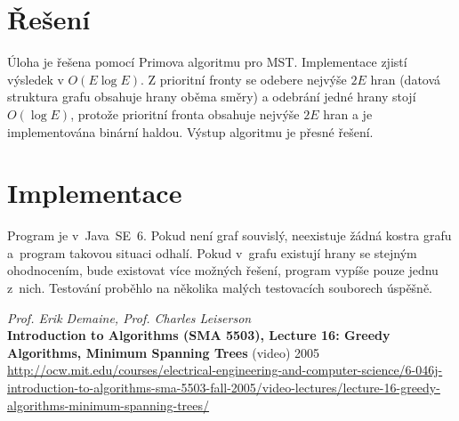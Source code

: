 \documentclass[11pt]{article}
\begin{document}
\clearpage
\section{Řešení}
Úloha je řešena pomocí Primova algoritmu pro MST. Implementace zjistí výsledek
v $O(E \log E)$. Z prioritní fronty se odebere nejvýše $2E$ hran (datová
struktura grafu obsahuje hrany oběma směry) a odebrání jedné hrany stojí
$O(\log E)$, protože prioritní fronta obsahuje nejvýše $2E$ hran a je
implementována binární haldou. Výstup algoritmu je přesné řešení.

\section{Implementace}
Program je v~Java~SE~6. Pokud není graf souvislý, neexistuje žádná kostra grafu
a~program takovou situaci odhalí. Pokud v~grafu existují hrany se stejným
ohodnocením, bude existovat více možných řešení, program vypíše pouze jednu
z~nich. Testování proběhlo na několika malých testovacích souborech úspěšně.

\begin{thebibliography}{1}

{\em Prof. Erik Demaine, Prof. Charles Leiserson} \\
{\bf Introduction to Algorithms (SMA 5503), 
    Lecture 16: Greedy Algorithms, Minimum Spanning Trees} (video) 2005 \\
\url{http://ocw.mit.edu/courses/electrical-engineering-and-computer-science/6-046j-introduction-to-algorithms-sma-5503-fall-2005/video-lectures/lecture-16-greedy-algorithms-minimum-spanning-trees/}

\end{thebibliography}
\end{document}

